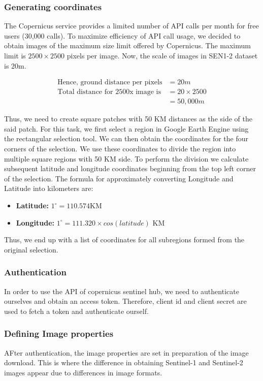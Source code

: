 \subsubsection{Generating coordinates}
The Copernicus service provides a limited number of API calls per month for free users (30,000 calls). To maximize efficiency of API call usage, we decided to obtain images of the maximum size limit offered by Copernicus. The maximum limit is $2500\times2500$ pixels per image. Now, the scale of images in SEN1-2 dataset is 20m.

\begin{align*}
    \text{Hence, ground distance per pixels} &= 20m \\
    \text{Total distance for 2500x image is} &= 20\times2500 \\
    &= 50,000m
\end{align*}

Thus, we need to create square patches with 50 KM distances as the side of the said patch. For this task, we first select a region in Google Earth Engine using the rectangular selection tool. We can then obtain the coordinates for the four corners of the selection. We use these coordinates to divide the region into multiple square regions with 50 KM side. To perform the division we calculate subsequent latitude and longitude coordinates beginning from the top left corner of the selection. The formula for approximately converting Longitude and Latitude into kilometers are:

\begin{itemize}
    \item \textbf{Latitude: } $1^\circ = 110.574$KM
    \item \textbf{Longitude:} $1^\circ = 111.320\times cos(latitude)$ KM
\end{itemize}

Thus, we end up with a list of coordinates for all subregions formed from the original selection.

\subsubsection{Authentication} \label{CopeAuth}
In order to use the API of copernicus sentinel hub, we need to authenticate ourselves and obtain an access token. Therefore, client id and client secret are used to fetch a token and authenticate ourself.

\subsubsection{Defining Image properties} \label{CopImgProp}
AFter authentication, the image properties are set in preparation of the image download. This is where the difference in obtaining Sentinel-1 and Sentinel-2 images appear due to differences in image formats.

